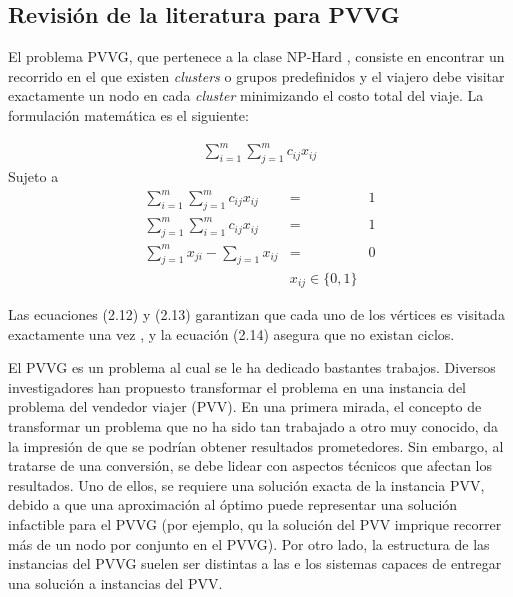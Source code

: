 \subsection{Revisión de la literatura para PVVG}
\label{cap:rev_lit_pvv}

El problema PVVG, que pertenece a la clase NP-Hard \citep{srivastava1969generalized,henrylab1969record}, consiste en encontrar un recorrido en el que existen \textit{clusters} o grupos predefinidos y el viajero debe visitar exactamente un nodo en cada \textit{cluster} minimizando el costo total del viaje. La formulación matemática es el siguiente:



\begin{eqnarray}
\sum_{i = 1}^{m} \sum_{j = 1}^{m}c_{ij}x_{ij}
\end{eqnarray}
Sujeto a
\begin{eqnarray}
\sum_{i = 1}^{m} \sum_{j = 1}^{m}c_{ij}x_{ij} &=& 1\\
\sum_{j = 1}^{m} \sum_{i = 1}^{m}c_{ij}x_{ij} &=& 1\\
\sum_{j = 1}^{m}x_{ji} - \sum_{j = 1}x_{ij}   &=& 0\\
&x_{ij} \in \{0, 1\}&
\end{eqnarray}


Las ecuaciones (2.12) y (2.13) garantizan que cada uno de los vértices es visitada exactamente una vez
, y la ecuación (2.14) asegura que no existan ciclos.


El PVVG es un problema al cual se le ha dedicado bastantes trabajos. Diversos investigadores  \citep{noon1993efficient,laporte1999computational,lien1993transformation,ben2003transformations} han propuesto transformar el problema en una instancia del problema del vendedor viajer (PVV). En una primera mirada, el concepto de transformar un problema que no ha sido tan trabajado a otro muy conocido, da la impresión de que se podrían obtener resultados prometedores. Sin embargo, al tratarse de una conversión, se debe lidear con aspectos técnicos que afectan los resultados. Uno de ellos, se requiere una solución exacta de la instancia PVV, debido a que una aproximación al óptimo puede representar una solución infactible para el PVVG (por ejemplo, qu la solución del PVV imprique recorrer más de un nodo por conjunto en el PVVG). Por otro lado, la estructura de las instancias del PVVG suelen ser distintas a las e los sistemas capaces de entregar una solución a instancias del PVV.

